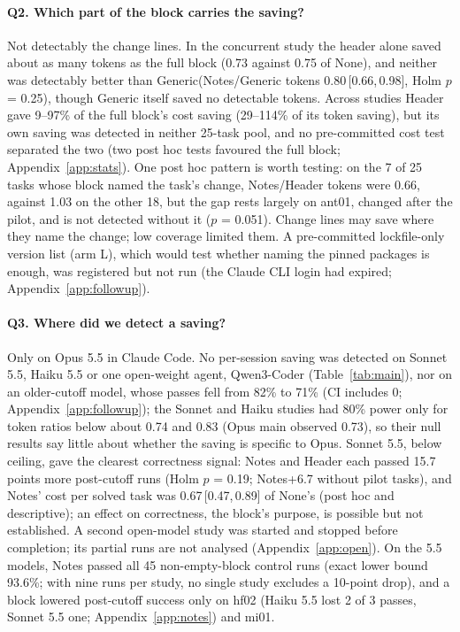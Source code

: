 \documentclass[11pt]{article}
\newcommand{\ci}[2]{\,[#1,\,#2]}
\newcommand{\aNone}{\textsf{None}\xspace}
\newcommand{\aNotes}{\textsf{Notes}\xspace}
\newcommand{\aHeader}{\textsf{Header}\xspace}
\newcommand{\aGen}{\textsf{Generic}\xspace}
\begin{document}
\paragraph{Q2. Which part of the block carries the saving?}
Not detectably the change lines.
In the concurrent study the header alone saved about as many tokens as the full block (0.73 against 0.75 of \aNone), and neither was detectably better than \aGen (\aNotes/\aGen tokens 0.80\ci{0.66}{0.98}, Holm $p$ = 0.25), though \aGen itself saved no detectable tokens.
Across studies \aHeader gave 9--97\% of the full block's cost saving (29--114\% of its token saving), but its own saving was detected in neither 25-task pool, and no pre-committed cost test separated the two (two post hoc tests favoured the full block; Appendix~\ref{app:stats}).
One post hoc pattern is worth testing: on the 7 of 25 tasks whose block named the task's change, \aNotes/\aHeader tokens were 0.66, against 1.03 on the other 18, but the gap rests largely on ant01, changed after the pilot, and is not detected without it ($p$ = 0.051).
Change lines may save where they name the change; low coverage limited them.
A pre-committed lockfile-only version list (arm L), which would test whether naming the pinned packages is enough, was registered but not run (the Claude CLI login had expired; Appendix~\ref{app:followup}).

\paragraph{Q3. Where did we detect a saving?}
Only on Opus 5.5 in Claude Code.
No per-session saving was detected on Sonnet 5.5, Haiku 5.5 or one open-weight agent, Qwen3-Coder (Table~\ref{tab:main}), nor on an older-cutoff model, whose passes fell from 82\% to 71\% (CI includes 0; Appendix~\ref{app:followup}); the Sonnet and Haiku studies had 80\% power only for token ratios below about 0.74 and 0.83 (Opus main observed 0.73), so their null results say little about whether the saving is specific to Opus.
Sonnet 5.5, below ceiling, gave the clearest correctness signal: \aNotes and \aHeader each passed 15.7 points more post-cutoff runs (Holm $p$ = 0.19; \aNotes +6.7 without pilot tasks), and \aNotes' cost per solved task was 0.67\ci{0.47}{0.89} of \aNone's (post hoc and descriptive); an effect on correctness, the block's purpose, is possible but not established.
A second open-model study was started and stopped before completion; its partial runs are not analysed (Appendix~\ref{app:open}).
On the 5.5 models, \aNotes passed all 45 non-empty-block control runs (exact lower bound 93.6\%; with nine runs per study, no single study excludes a 10-point drop), and a block lowered post-cutoff success only on hf02 (Haiku 5.5 lost 2 of 3 passes, Sonnet 5.5 one; Appendix~\ref{app:notes}) and mi01.
\end{document}
